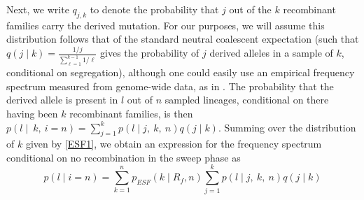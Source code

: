 \documentclass[a4paper,10pt]{article}
\newcommand{\gc}[1]{{\it \color{red} (#1)} }
\begin{document}
Next, we write $q_{j,k}$ to denote the probability that $j$ out of the $k$ recombinant families carry the derived mutation. For our purposes, we will assume this distribution follows that of the standard neutral coalescent expectation (such that $q(j \mid k) = \frac{1/j}{\sum_{\ell=1}^{k-1}1/\ell}$ gives the probability of $j$ derived alleles in a sample of $k$, conditional on segregation), although one could easily use an empirical frequency spectrum measured from genome-wide data, as in \citep{NielsenKim}. The probability that the derived allele is present in $l$ out of $n$ sampled lineages, conditional on there having been $k$ recombinant families, is then $p(l \mid ~k, ~i = n ) = \sum_{j=1}^k p(l \mid j,~k, ~n)q(j\mid k)$. Summing over the distribution of $k$ given by \eqref{ESF1}, we obtain an expression for the frequency spectrum conditional on no recombination in the sweep phase as
\begin{equation}
p(l \mid i=n) =  \sum_{k=1}^{n}  p_{ESF}(k \mid R_f,n)  \sum_{j=1}^k p(l \mid j,~k, ~n)q(j\mid k)
\end{equation}
%
\end{document}
